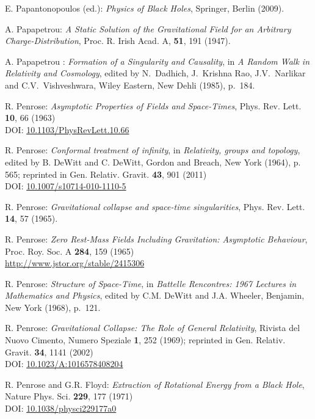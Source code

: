 \begin{thebibliography}{123}
E. Papantonopoulos (ed.): {\em Physics of Black Holes}, Springer, Berlin (2009).

A. Papapetrou:
{\em A Static Solution of the Gravitational Field for an Arbitrary Charge-Distribution},
Proc. R. Irish Acad. A, {\bf 51}, 191 (1947).

A. Papapetrou : {\em Formation of a Singularity and Causality},
in {\em A Random Walk in Relativity and Cosmology},
edited by N.~Dadhich, J.~Krishna Rao, J.V.~Narlikar and C.V.~Vishveshwara,
Wiley Eastern, New Dehli (1985), p.~184.

R. Penrose: {\em Asymptotic Properties of Fields and Space-Times},
Phys. Rev. Lett. {\bf 10}, 66 (1963)\\
DOI: \href{https://doi.org/10.1103/PhysRevLett.10.66}{10.1103/PhysRevLett.10.66}

R. Penrose: {\em Conformal treatment of infinity}, in {\em Relativity, groups and topology},
edited by B. DeWitt and C. DeWitt,
Gordon and Breach, New York (1964), p. 565; reprinted in
Gen. Relativ. Gravit. {\bf 43}, 901 (2011)\\
DOI: \href{https://doi.org/10.1007/s10714-010-1110-5}{10.1007/s10714-010-1110-5}

R. Penrose: {\em Gravitational collapse and space-time singularities},
Phys. Rev. Lett. {\bf 14}, 57 (1965).

R. Penrose:
{\em Zero Rest-Mass Fields Including Gravitation: Asymptotic Behaviour},
Proc. Roy. Soc. A {\bf 284}, 159 (1965)\\
\url{http://www.jstor.org/stable/2415306}

R. Penrose: {\em Structure of Space-Time},
in {\em Battelle Rencontres: 1967 Lectures in Mathematics and Physics},
edited by C.M. DeWitt and J.A. Wheeler,
Benjamin, New York (1968), p.~121.

R. Penrose: {\em Gravitational Collapse: The Role of General Relativity},
Rivista del Nuovo Cimento, Numero Speziale {\bf 1}, 252 (1969); reprinted in
Gen. Relativ. Gravit. {\bf 34}, 1141 (2002)\\
DOI: \href{https://doi.org/10.1023/A:1016578408204}{10.1023/A:1016578408204}

R. Penrose and G.R. Floyd: {\em Extraction of Rotational Energy from
a Black Hole},  Nature Phys. Sci. {\bf 229}, 177 (1971)\\
DOI: \href{https://doi.org/10.1038/physci229177a0}{10.1038/physci229177a0}


\end{thebibliography}
